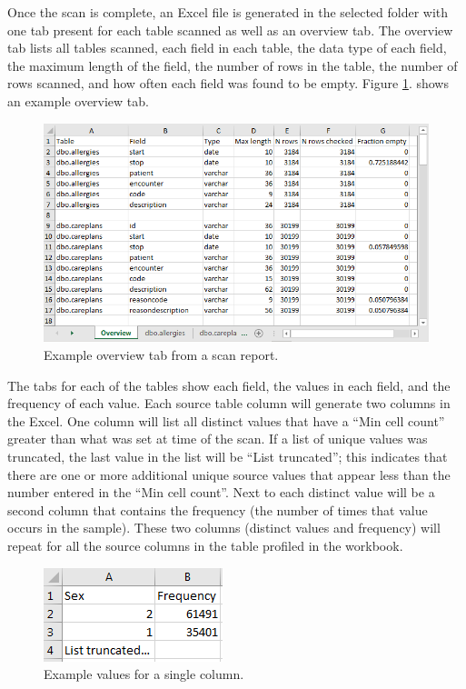 \documentclass[11pt]{book}
\theoremstyle{definition}
\theoremstyle{definition}
\theoremstyle{definition}
\theoremstyle{remark}
\begin{document}
Once the scan is complete, an Excel file is generated in the selected
folder with one tab present for each table scanned as well as an
overview tab. The overview tab lists all tables scanned, each field in
each table, the data type of each field, the maximum length of the
field, the number of rows in the table, the number of rows scanned, and
how often each field was found to be empty. Figure
\ref{fig:ScanOverviewTab}. shows an example overview tab.

\begin{figure}

{\centering \includegraphics[width=1\linewidth]{images/ExtractTransformLoad/ScanOverviewTab} 

}

\caption{Example overview tab from a scan report.}\label{fig:ScanOverviewTab}
\end{figure}

The tabs for each of the tables show each field, the values in each
field, and the frequency of each value. Each source table column will
generate two columns in the Excel. One column will list all distinct
values that have a ``Min cell count'' greater than what was set at time
of the scan. If a list of unique values was truncated, the last value in
the list will be ``List truncated''; this indicates that there are one
or more additional unique source values that appear less than the number
entered in the ``Min cell count''. Next to each distinct value will be a
second column that contains the frequency (the number of times that
value occurs in the sample). These two columns (distinct values and
frequency) will repeat for all the source columns in the table profiled
in the workbook.

\begin{figure}

{\centering \includegraphics[width=0.3\linewidth]{images/ExtractTransformLoad/ScanSex} 

}

\caption{Example values for a single column.}\label{fig:scanSex}
\end{figure}
\end{document}

